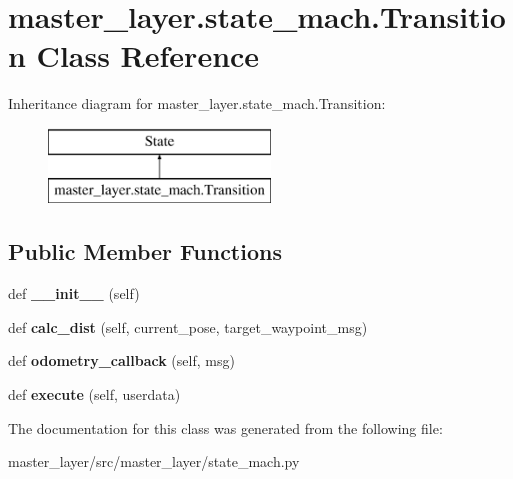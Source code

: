 \hypertarget{classmaster__layer_1_1state__mach_1_1Transition}{}\section{master\+\_\+layer.\+state\+\_\+mach.\+Transition Class Reference}
\label{classmaster__layer_1_1state__mach_1_1Transition}
Inheritance diagram for master\+\_\+layer.\+state\+\_\+mach.\+Transition\+:\begin{figure}[H]
\begin{center}
\leavevmode
\includegraphics[height=2.000000cm]{classmaster__layer_1_1state__mach_1_1Transition}
\end{center}
\end{figure}
\subsection*{Public Member Functions}
\begin{DoxyCompactItemize}
\item 
\mbox{\label{classmaster__layer_1_1state__mach_1_1Transition_a5529eb3782f7909e8f4f707acd3e6fa4}} 
def {\bfseries \+\_\+\+\_\+init\+\_\+\+\_\+} (self)
\item 
\mbox{\label{classmaster__layer_1_1state__mach_1_1Transition_a156d23c12c28b0418fa94ac90cae8b03}} 
def {\bfseries calc\+\_\+dist} (self, current\+\_\+pose, target\+\_\+waypoint\+\_\+msg)
\item 
\mbox{\label{classmaster__layer_1_1state__mach_1_1Transition_a9ab8554f6ddc9a4d611ad5aa248405c5}} 
def {\bfseries odometry\+\_\+callback} (self, msg)
\item 
\mbox{\label{classmaster__layer_1_1state__mach_1_1Transition_a81f0deb42640b8ee2cbef1f69ccc7d9b}} 
def {\bfseries execute} (self, userdata)
\end{DoxyCompactItemize}


The documentation for this class was generated from the following file\+:\begin{DoxyCompactItemize}
\item 
master\+\_\+layer/src/master\+\_\+layer/state\+\_\+mach.\+py\end{DoxyCompactItemize}
